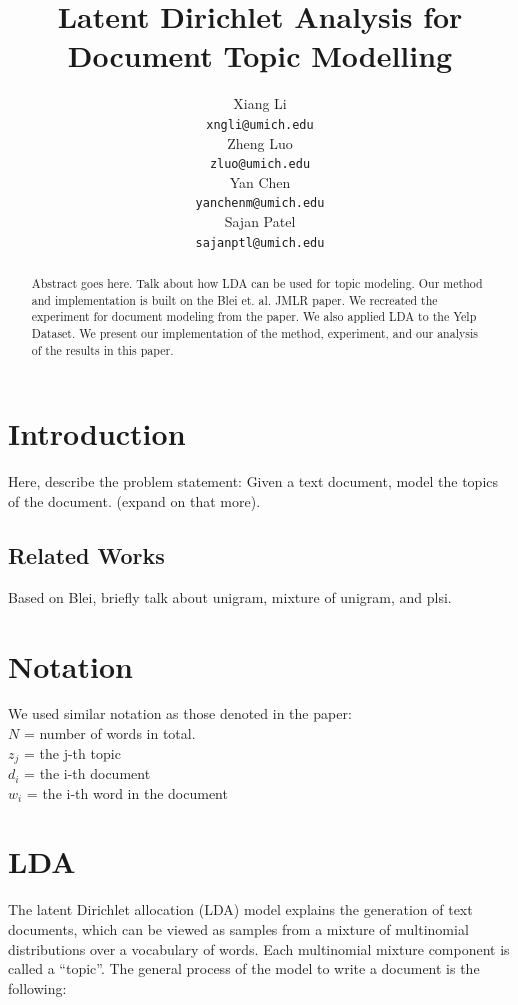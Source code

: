 \documentclass{article} %
\title{Latent Dirichlet Analysis for Document Topic Modelling}
\author{
Xiang Li\\
\texttt{xngli@umich.edu} \\
\And
Zheng Luo \\
\texttt{zluo@umich.edu} \\
\AND
Yan Chen\\
\texttt{yanchenm@umich.edu} \\
\And
Sajan Patel\\
\texttt{sajanptl@umich.edu} \\
}
\begin{document}
\maketitle

\begin{abstract}
Abstract goes here. Talk about how LDA can be used for topic modeling. Our method and implementation is
built on the Blei et. al. JMLR paper. We recreated the experiment for document modeling from the paper.
We also applied LDA to the Yelp Dataset. We present our implementation of the method, experiment, and
our analysis of the results in this paper.
\end{abstract}

\section{Introduction}
Here, describe the problem statement: Given a text document, model the topics of the document. (expand on that more).

\subsection{Related Works}
Based on Blei, briefly talk about unigram, mixture of unigram, and plsi.

\section{Notation}
We used similar notation as those denoted in the paper: \\
$N$ =  number of words in total.\\
$z_j$ = the j-th topic\\
$d_i$ = the i-th document\\
$w_i$ = the i-th word in the document\\

\section{LDA}
The latent Dirichlet allocation (LDA) model explains the generation of text documents, which can be viewed as samples from a mixture of multinomial distributions over a vocabulary of words. Each multinomial mixture component is called a “topic”. The general process of the model to write a document is the following:
\end{document}

